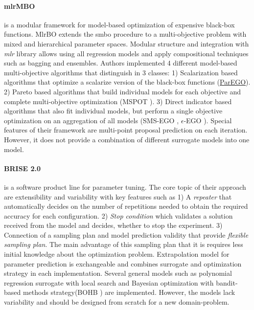         \paragraph{mlrMBO}\cite{BischlmlrMBO} is a modular framework for model-based optimization of expensive black-box functions. MlrBO extends the \gls{smbo} procedure to a multi-objective problem with mixed and hierarchical parameter spaces. Modular structure and integration with \emph{mlr} library allows using all regression models and apply compositional techniques such as bagging and ensembles. Authors implemented 4 different model-based multi-objective algorithms that distinguish in 3 classes: 1) Scalarization based algorithms that optimize a scalarize version of the black-box functions (\hyperref[alg:ParEGO]{ParEGO}). 2) Pareto based algorithms that build individual models for each objective and complete multi-objective optimization (MSPOT \cite{ZaeffererBNWE13}). 3) Direct indicator based algorithms that also fit individual models, but perform a single objective optimization on an aggregation of all models (SMS-EGO \cite{inproceedings}, $\epsilon$-EGO \cite{WagEGOe}).
        Special features of their framework are multi-point proposal prediction on each iteration. However, it does not provide a combination of different surrogate models into one model.
       

        \paragraph{BRISE 2.0} \cite{Pukhkaiev19} is a software product line for parameter tuning. The core topic of their approach are extensibility and variability with key features such as 1) A \emph{repeater} that automatically decides on the number of repetitions needed to obtain the required accuracy for each configuration. 2) \emph{Stop condition} which validates a solution received from the model and decides, whether to stop the experiment. 3) Connection of a sampling plan and model prediction validity that provide \emph{flexible sampling plan}. The main advantage of this sampling plan that it is requires less initial knowledge about the optimization problem.
        Extrapolation model for parameter prediction is exchangeable and combines surrogate and optimization strategy in each implementation. Several general models such as polynomial regression surrogate with local search and Bayesian optimization with bandit-based methods strategy(BOHB \cite{FalknerBOHB}) are implemented.  However, the models lack variability and should be designed from scratch for a new domain-problem.

